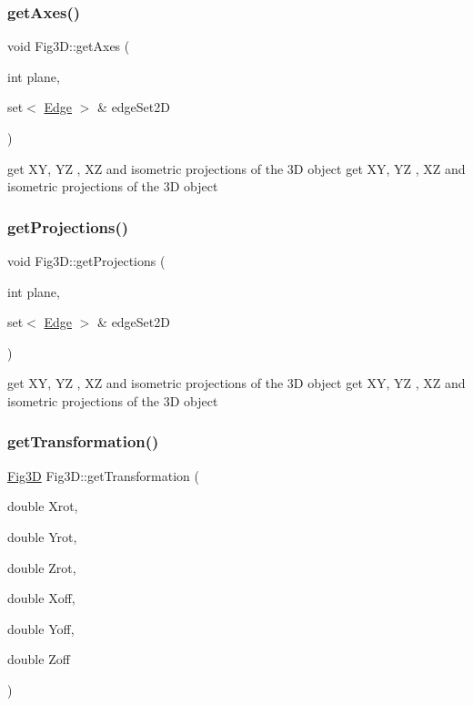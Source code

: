 \subsubsection{\texorpdfstring{get\+Axes()}{getAxes()}}
{\footnotesize\ttfamily void Fig3\+D\+::get\+Axes (\begin{DoxyParamCaption}\item[{int}]{plane,  }\item[{set$<$ \hyperlink{structEdge}{Edge} $>$ \&}]{edge\+Set2D }\end{DoxyParamCaption})}

get XY, YZ , XZ and isometric projections of the 3D object get XY, YZ , XZ and isometric projections of the 3D object \mbox{\label{classFig3D_af1000067e4e230b41059896c8cacd4e1}} 
\subsubsection{\texorpdfstring{get\+Projections()}{getProjections()}}
{\footnotesize\ttfamily void Fig3\+D\+::get\+Projections (\begin{DoxyParamCaption}\item[{int}]{plane,  }\item[{set$<$ \hyperlink{structEdge}{Edge} $>$ \&}]{edge\+Set2D }\end{DoxyParamCaption})}

get XY, YZ , XZ and isometric projections of the 3D object get XY, YZ , XZ and isometric projections of the 3D object \mbox{\label{classFig3D_a25a3607c2735064d0bc0081b271ea224}} 
\subsubsection{\texorpdfstring{get\+Transformation()}{getTransformation()}}
{\footnotesize\ttfamily \hyperlink{classFig3D}{Fig3D} Fig3\+D\+::get\+Transformation (\begin{DoxyParamCaption}\item[{double}]{Xrot,  }\item[{double}]{Yrot,  }\item[{double}]{Zrot,  }\item[{double}]{Xoff,  }\item[{double}]{Yoff,  }\item[{double}]{Zoff }\end{DoxyParamCaption})}

